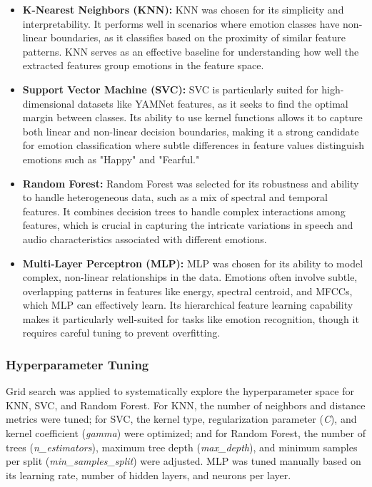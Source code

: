 \documentclass{article}
\begin{document}
\begin{itemize}
    \item \textbf{K-Nearest Neighbors (KNN):} 
    KNN was chosen for its simplicity and interpretability. It performs well in scenarios where emotion classes have 
    non-linear boundaries, as it classifies based on the proximity of similar feature patterns. KNN serves as an 
    effective baseline for understanding how well the extracted features group emotions in the feature space.

    \item \textbf{Support Vector Machine (SVC):} 
    SVC is particularly suited for high-dimensional datasets like YAMNet features, as it seeks to find the optimal 
    margin between classes. Its ability to use kernel functions allows it to capture both linear and non-linear decision 
    boundaries, making it a strong candidate for emotion classification where subtle differences in feature values 
    distinguish emotions such as "Happy" and "Fearful."

    \item \textbf{Random Forest:} 
    Random Forest was selected for its robustness and ability to handle heterogeneous data, such as a mix of spectral 
    and temporal features. It combines decision trees to handle complex interactions among features, which is crucial in 
    capturing the intricate variations in speech and audio characteristics associated with different emotions.

    \item \textbf{Multi-Layer Perceptron (MLP):} 
    MLP was chosen for its ability to model complex, non-linear relationships in the data. Emotions often involve subtle, 
    overlapping patterns in features like energy, spectral centroid, and MFCCs, which MLP can effectively learn. Its 
    hierarchical feature learning capability makes it particularly well-suited for tasks like emotion recognition, though 
    it requires careful tuning to prevent overfitting.
\end{itemize}

\subsubsection*{Hyperparameter Tuning}

Grid search was applied to systematically explore the hyperparameter space for KNN, SVC, and Random Forest. For KNN, the 
number of neighbors and distance metrics were tuned; for SVC, the kernel type, regularization parameter (\textit{C}), and 
kernel coefficient (\textit{gamma}) were optimized; and for Random Forest, the number of trees (\textit{n\_estimators}), maximum tree depth (\textit{max\_depth}), and minimum samples per split (\textit{min\_samples\_split}) were adjusted. MLP was tuned manually based on its learning rate, number of hidden layers, and neurons per layer.
\end{document}
